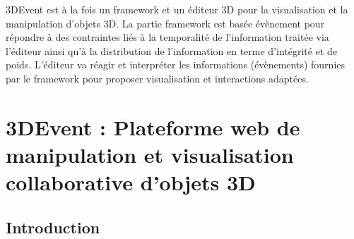 
3DEvent est à la fois un \gls{framework} et un éditeur 3D pour la visualisation et la 
manipulation d'objets 3D. La partie \gls{framework} est basée évènement pour 
répondre à des contraintes liés à la temporalité de l'information traitée via l'éditeur 
ainsi qu'à la distribution de l'information en terme d'intégrité et de poids. L'éditeur 
va réagir et interpréter les informations (évènements) fournies par le 
\gls{framework} pour proposer visualisation et interactions adaptées.

\section{3DEvent : Plateforme web de manipulation et visualisation 
	collaborative 
	d'objets 3D}


\subsection{Introduction}

